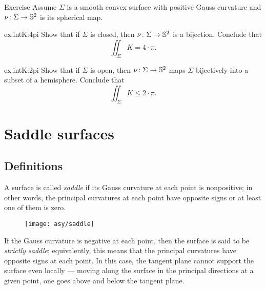 \begin{thm}{Exercise}\label{ex:intK}
Assume $\Sigma$ is a smooth convex surface with positive Gauss curvature
and $\nu\colon\Sigma\to \mathbb{S}^2$ is its spherical map.

\begin{multicols}{2}

\begin{subthm}{ex:intK:4pi}
Show that if $\Sigma$ is closed, then $\nu\colon\Sigma\to \mathbb{S}^2$ is a bijection.
Conclude that 
\[\iint_\Sigma K=4\cdot\pi.\]
\end{subthm}

\columnbreak

\begin{subthm}{ex:intK:2pi}
Show that if $\Sigma$ is open, then $\nu\colon\Sigma\to \mathbb{S}^2$
maps $\Sigma$ bijectively into a subset of a hemisphere.
Conclude that 
\[\iint_\Sigma K\le 2\cdot\pi.\]
\end{subthm}

\end{multicols}

\end{thm}

\chapter{Saddle surfaces}

\section{Definitions}\label{sec:saddle}

A surface is called \emph{saddle} if its Gauss curvature at each point is nonpositive;
in other words, the principal curvatures at each point have opposite signs or at least one of them is zero.

\begin{wrapfigure}{r}{43 mm}
\vskip-0mm
\centering
\texttt{[image: asy/saddle]}
\vskip0mm
\end{wrapfigure}

If the Gauss curvature is negative at each point,
then the surface is said to be {}\emph{strictly saddle};
equivalently, this means that the principal curvatures have opposite signs at each point.
In this case, the tangent plane cannot support the surface even locally --- moving along the surface in the principal directions at a given point, one goes above and below the tangent plane.


